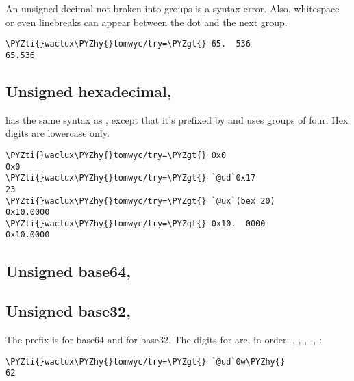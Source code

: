 An unsigned decimal not broken into groups is a syntax error.
Also, whitespace or even linebreaks can appear between the dot
and the next group.

\begin{framed_shaded}
\begin{Verbatim}[fontsize=\relsize{-2.5},fontseries=b,commandchars=\\\{\}]
\PYZti{}waclux\PYZhy{}tomwyc/try=\PYZgt{} 65.  536
65.536
\end{Verbatim}
\end{framed_shaded}

\subsection{Unsigned hexadecimal, }

 has the same syntax as , except that it's prefixed by
 and uses groups of four.  Hex digits are lowercase only.

\begin{framed_shaded}
\begin{Verbatim}[fontsize=\relsize{-2.5},fontseries=b,commandchars=\\\{\}]
\PYZti{}waclux\PYZhy{}tomwyc/try=\PYZgt{} 0x0
0x0
\PYZti{}waclux\PYZhy{}tomwyc/try=\PYZgt{} `@ud`0x17
23
\PYZti{}waclux\PYZhy{}tomwyc/try=\PYZgt{} `@ux`(bex 20)
0x10.0000
\PYZti{}waclux\PYZhy{}tomwyc/try=\PYZgt{} 0x10.  0000
0x10.0000
\end{Verbatim}
\end{framed_shaded}

\subsection{Unsigned base64, }

\subsection{Unsigned base32, }

The prefix is  for base64 and  for base32.  The digits
for  are, in order: , , , -, \sig:

\begin{framed_shaded}
\begin{Verbatim}[fontsize=\relsize{-2.5},fontseries=b,commandchars=\\\{\}]
\PYZti{}waclux\PYZhy{}tomwyc/try=\PYZgt{} `@ud`0w\PYZhy{}
62
\end{Verbatim}
\end{framed_shaded}

